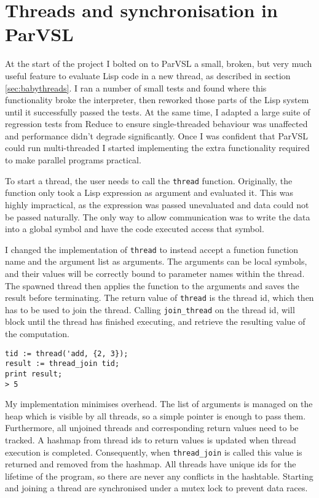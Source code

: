 \section{Threads and synchronisation in ParVSL}
\label{sec:threads}

At the start of the project I bolted on to ParVSL a small, broken, but very much useful feature to evaluate
Lisp code in a new thread, as described in section \ref{sec:babythreads}. I ran a number of small tests
and found where this functionality broke the interpreter, then reworked those parts of the Lisp system
until it successfully passed the tests. At the same time, I adapted a large suite of regression tests
from Reduce to ensure single-threaded behaviour was unaffected and performance didn't degrade significantly.
Once I was confident that ParVSL could run multi-threaded I started implementing the extra functionality
required to make parallel programs practical.

To start a thread, the user needs to call the \verb|thread| function.
Originally, the function only took a Lisp expression as argument and evaluated it. This was highly impractical,
as the expression was passed unevaluated and data could not be passed naturally. The only way to allow
communication was to write the data into a global symbol and have the code executed access that symbol.

I changed the implementation of \verb|thread| to instead accept a function function name and the argument list
as arguments. The arguments can be local symbols, and their values will be correctly bound to parameter names
within the thread. The spawned thread then applies the function to the arguments and saves the result
before terminating. The return value of \verb|thread| is the thread id, which then has to be used to
join the thread. Calling  \verb|join_thread| on the thread id, will block until the thread has finished
executing, and retrieve the resulting value of the computation.

\begin{verbatim}
tid := thread('add, {2, 3});
result := thread_join tid;
print result;
> 5
\end{verbatim}

My implementation minimises overhead. The list of arguments is managed on the heap which is visible by all
threads, so a simple pointer is enough to pass them. Furthermore, all unjoined threads and corresponding return values
need to be tracked.
A hashmap from thread ids to return values is updated when thread execution is completed.
Consequently, when \verb|thread_join| is called this value is returned and removed from the hashmap. All threads
have unique ids for the lifetime of the program, so there are never any conflicts in the hashtable.
Starting and joining a thread are synchronised under a mutex lock to prevent data races.

